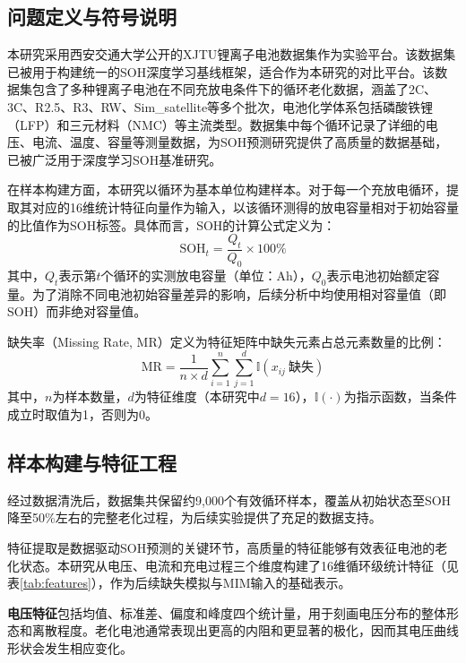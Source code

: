 \documentclass[10pt,a4paper]{ctexart}
\begin{document}
\subsection{问题定义与符号说明}

本研究采用西安交通大学公开的XJTU锂离子电池数据集作为实验平台\cite{wang2024open,duan2025lithium}。该数据集已被用于构建统一的SOH深度学习基线框架\cite{wang2024open}，适合作为本研究的对比平台。该数据集包含了多种锂离子电池在不同充放电条件下的循环老化数据，涵盖了2C、3C、R2.5、R3、RW、Sim\_satellite等多个批次，电池化学体系包括磷酸铁锂（LFP）和三元材料（NMC）等主流类型。数据集中每个循环记录了详细的电压、电流、温度、容量等测量数据，为SOH预测研究提供了高质量的数据基础，已被广泛用于深度学习SOH基准研究\cite{wang2024pinn}。

在样本构建方面，本研究以循环为基本单位构建样本。对于每一个充放电循环，提取其对应的16维统计特征向量作为输入，以该循环测得的放电容量相对于初始容量的比值作为SOH标签。具体而言，SOH的计算公式定义为：
\begin{equation}
    \text{SOH}_t = \frac{Q_t}{Q_0} \times 100\%
\end{equation}
其中，$Q_t$表示第$t$个循环的实测放电容量（单位：Ah），$Q_0$表示电池初始额定容量。为了消除不同电池初始容量差异的影响，后续分析中均使用相对容量值（即SOH）而非绝对容量值。

缺失率（Missing Rate, MR）定义为特征矩阵中缺失元素占总元素数量的比例：
\begin{equation}
    \text{MR} = \frac{1}{n \times d} \sum_{i=1}^{n}\sum_{j=1}^{d} \mathbb{I}(x_{ij}\ \text{缺失})
    \label{eq:mr}
\end{equation}
其中，$n$为样本数量，$d$为特征维度（本研究中$d=16$），$\mathbb{I}(\cdot)$为指示函数，当条件成立时取值为1，否则为0。

\subsection{样本构建与特征工程}

经过数据清洗后，数据集共保留约9,000个有效循环样本，覆盖从初始状态至SOH降至50\%左右的完整老化过程，为后续实验提供了充足的数据支持。

特征提取是数据驱动SOH预测的关键环节，高质量的特征能够有效表征电池的老化状态\cite{sun2025batteryhealth,wang2022chargingfeatures}。本研究从电压、电流和充电过程三个维度构建了16维循环级统计特征（见表\ref{tab:features}），作为后续缺失模拟与MIM输入的基础表示。

\textbf{电压特征}包括均值、标准差、偏度和峰度四个统计量，用于刻画电压分布的整体形态和离散程度。老化电池通常表现出更高的内阻和更显著的极化，因而其电压曲线形状会发生相应变化。
\end{document}
